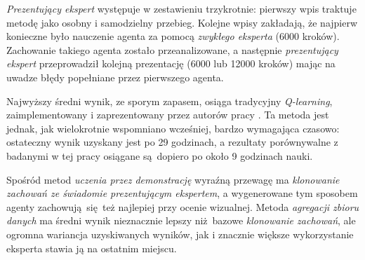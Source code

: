 \documentclass[polish,master,a4paper,oneside]{ppfcmthesis}
\begin{document}
\begin{figure}[H]
\end{figure}

\textit{Prezentujący ekspert} występuje w zestawieniu trzykrotnie: pierwszy wpis traktuje metodę jako osobny i samodzielny przebieg. Kolejne wpisy zakładają, że najpierw konieczne było nauczenie agenta za pomocą \textit{zwykłego eksperta} (6000 kroków). Zachowanie takiego agenta zostało przeanalizowane, a następnie \textit{prezentujący ekspert} przeprowadził kolejną prezentację (6000 lub 12000 kroków) mając na uwadze błędy popełniane przez pierwszego agenta.

Najwyższy średni wynik, ze sporym zapasem, osiąga tradycyjny \textit{Q-learning}, zaimplementowany i zaprezentowany przez autorów pracy \cite{DBLP:journals/corr/KempkaWRTJ16}. Ta metoda jest jednak, jak wielokrotnie wspomniano wcześniej, bardzo wymagająca czasowo: ostateczny wynik uzyskany jest po 29 godzinach, a rezultaty porównywalne z badanymi w tej pracy osiągane są dopiero po około 9 godzinach nauki.

Spośród metod \textit{uczenia przez demonstrację} wyraźną przewagę ma \textit{klonowanie zachowań ze świadomie prezentującym ekspertem}, a wygenerowane tym sposobem agenty zachowują się też najlepiej przy ocenie wizualnej. Metoda \textit{agregacji zbioru danych} ma średni wynik nieznacznie lepszy niż bazowe \textit{klonowanie zachowań}, ale ogromna wariancja uzyskiwanych wyników, jak i znacznie większe wykorzystanie eksperta stawia ją na ostatnim miejscu.
\end{document}
